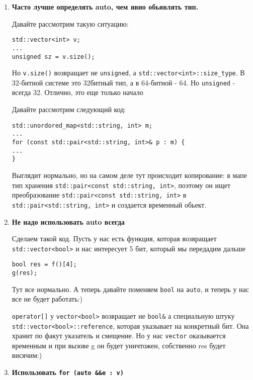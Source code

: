 	\begin{enumerate}
		\item \textbf{Часто лучше определять auto, чем явно обьявлять тип.}
	
		Давайте рассмотрим такую ситуацию:
\begin{verbatim}
std::vector<int> v;
...
unsigned sz = v.size();
\end{verbatim}
		Но \texttt{v.size()} возвращает не \texttt{unsigned}, а \texttt{std::vector<int>::size_type}. В 32-битной системе это 32битный тип, а в 64-битной - 64. Но \texttt{unsigned} - всегда 32.
		Отлично, это еще только начало
		
		Давайте рассмотрим следующий код:
\begin{verbatim}
std::unordored_map<std::string, int> m;
...
for (const std::pair<std::string, int>& p : m) {
...
}
\end{verbatim}
		Выглядит нормально, но на самом деле тут происходит копирование: в мапе тип хранения \texttt{std::pair<const std::string, int>}, поэтому он ищет преобразование \texttt{std::pair<const std::string, int>} в \texttt{std::pair<std::string, int>} и создается временный обьект.
		
	    \item \textbf{Не надо использовать auto всегда}
	    
		Сделаем такой код. Пусть у нас есть функция, которая возвращает \texttt{std::vector<bool>} и нас интересует 5 бит, который мы передадим дальше
\begin{verbatim}
bool res = f()[4];
g(res);
\end{verbatim}
		Тут все нормально. А теперь давайте поменяем \texttt{bool} на \texttt{auto}, и теперь у нас все не будет работать:)
		
		\texttt{operator[]} у \texttt{vector<bool>} возвращает не \texttt{bool&} а специальную штуку \texttt{std::vector<bool>::reference}, которая указывает на конкретный бит. Она хранит по факут указатель и смещение. Но у нас \texttt{vector} оказывается временным и при вызове g он будет уничтожен, собственно res будет висячим:)
		
		\item \textbf{Использовать \texttt{for (auto &&e : v)}}
		

\end{enumerate}

